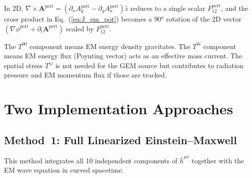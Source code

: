 \documentclass[11pt,a4paper]{article}
\newcommand{\vv}[1]{\mathbf{#1}}
\begin{document}
In 2D, $\nabla\times\vv{A}^{\mathrm{pert}} = (\partial_x A_y^{\mathrm{pert}} - \partial_y A_x^{\mathrm{pert}})\hat{z}$ reduces to a single scalar $F_{12}^{\mathrm{pert}}$, and the cross product in Eq.~(\ref{eq:J_em_pot}) becomes a 90° rotation of the 2D vector $(\nabla\phi^{\mathrm{pert}}+\partial_t\vv{A}^{\mathrm{pert}})$ scaled by $F_{12}^{\mathrm{pert}}$.

The $T^{00}$ component means EM energy density gravitates.  The $T^{0i}$ component means EM energy flux (Poynting vector) acts as an effective mass current.  The spatial stress $T^{ij}$ is not needed for the GEM source but contributes to radiation pressure and EM momentum flux if those are tracked.

\section{Two Implementation Approaches}

\subsection{Method~1: Full Linearized Einstein--Maxwell}

This method integrates all 10 independent components of $\bar{h}^{\mu\nu}$ together with the EM wave equation in curved spacetime.
\end{document}
